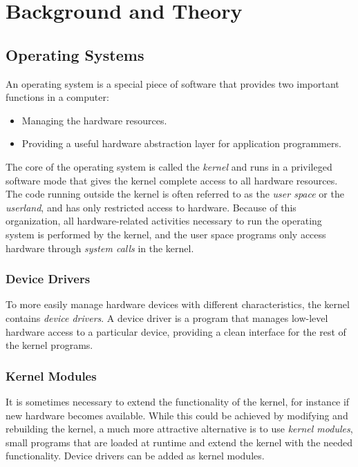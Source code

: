 \chapter{Background and Theory}



\section{Operating Systems}
An operating system is a special piece of software that provides two important functions in a computer:
\begin{itemize}
  \item Managing the hardware resources.
  \item Providing a useful hardware abstraction layer for application programmers.
\end{itemize}
The core of the operating system is called the \emph{kernel} and runs in a privileged software mode that gives the kernel complete access to all hardware resources. The code running outside the kernel is often referred to as the \emph{user space} or the \emph{userland}, and has only restricted access to hardware. Because of this organization, all hardware-related activities necessary to run the operating system is performed by the kernel, and the user space programs only access hardware through \emph{system calls} in the kernel.\cite{modern-operating-systems}

\subsection{Device Drivers}
To more easily manage hardware devices with different characteristics, the kernel contains \emph{device drivers}. A device driver is a program that manages low-level hardware access to a particular device, providing a clean interface for the rest of the kernel programs.

\subsection{Kernel Modules}
It is sometimes necessary to extend the functionality of the kernel, for instance if new hardware becomes available. While this could be achieved by modifying and rebuilding the kernel, a much more attractive alternative is to use \emph{kernel modules}, small programs that are loaded at runtime and extend the kernel with the needed functionality. Device drivers can be added as kernel modules.

